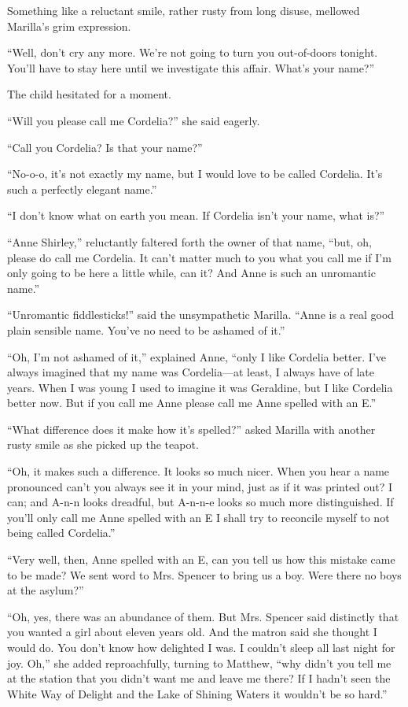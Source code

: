 \documentclass[a4paper]{article}
\begin{document}
Something like a reluctant smile, rather rusty from long disuse, mellowed Marilla's grim expression.

``Well, don't cry any more. We're not going to turn you out-of-doors tonight. You'll have to stay here until we investigate this affair. What's your name?''

The child hesitated for a moment.

``Will you please call me Cordelia?'' she said eagerly.

``Call you Cordelia? Is that your name?''

``No-o-o, it's not exactly my name, but I would love to be called Cordelia. It's such a perfectly elegant name.''

``I don't know what on earth you mean. If Cordelia isn't your name, what is?''

``Anne Shirley,'' reluctantly faltered forth the owner of that name, ``but, oh, please do call me Cordelia. It can't matter much to you what you call me if I'm only going to be here a little while, can it? And Anne is such an unromantic name.''

``Unromantic fiddlesticks!'' said the unsympathetic Marilla. ``Anne is a real good plain sensible name. You've no need to be ashamed of it.''

``Oh, I'm not ashamed of it,'' explained Anne, ``only I like Cordelia better. I've always imagined that my name was Cordelia---at least, I always have of late years. When I was young I used to imagine it was Geraldine, but I like Cordelia better now. But if you call me Anne please call me Anne spelled with an E.''

``What difference does it make how it's spelled?'' asked Marilla with another rusty smile as she picked up the teapot.

``Oh, it makes such a difference. It looks so much nicer. When you hear a name pronounced can't you always see it in your mind, just as if it was printed out? I can; and A-n-n looks dreadful, but A-n-n-e looks so much more distinguished. If you'll only call me Anne spelled with an E I shall try to reconcile myself to not being called Cordelia.''

``Very well, then, Anne spelled with an E, can you tell us how this mistake came to be made? We sent word to Mrs. Spencer to bring us a boy. Were there no boys at the asylum?''

``Oh, yes, there was an abundance of them. But Mrs. Spencer said distinctly that you wanted a girl about eleven years old. And the matron said she thought I would do. You don't know how delighted I was. I couldn't sleep all last night for joy. Oh,'' she added reproachfully, turning to Matthew, ``why didn't you tell me at the station that you didn't want me and leave me there? If I hadn't seen the White Way of Delight and the Lake of Shining Waters it wouldn't be so hard.''
\end{document}
